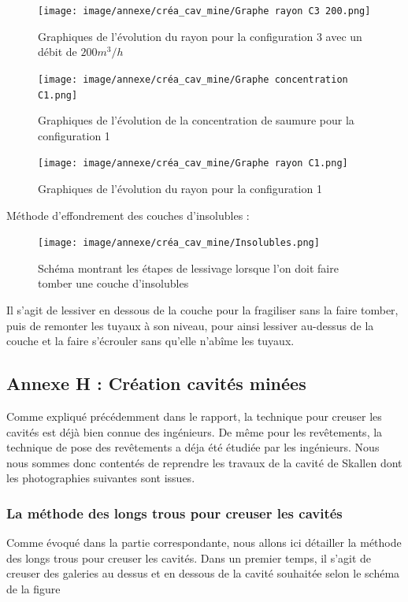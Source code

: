 \documentclass[11pt,french,a4paper]{article}
\begin{document}
\begin{figure}[!h]
  \centering
  \texttt{[image: image/annexe/créa\_cav\_mine/Graphe rayon C3 200.png]}
  \caption{Graphiques de l'évolution du rayon pour la configuration 3 avec un débit de $200m^3/h$}
  \end{figure}

\begin{figure}[!h]
  \centering
  \texttt{[image: image/annexe/créa\_cav\_mine/Graphe concentration C1.png]}
  \caption{Graphiques de l'évolution de la concentration de saumure pour la configuration 1}
  \end{figure}

\begin{figure}[!h]
  \centering
  \texttt{[image: image/annexe/créa\_cav\_mine/Graphe rayon C1.png]}
  \caption{Graphiques de l'évolution du rayon pour la configuration 1}
  \end{figure}

Méthode d’effondrement des couches d’insolubles :

\begin{figure}[!h]
  \centering
  \texttt{[image: image/annexe/créa\_cav\_mine/Insolubles.png]}
  \caption{Schéma montrant les étapes de lessivage lorsque l’on doit faire tomber une couche d’insolubles }
  \end{figure}

Il s’agit de lessiver en dessous de la couche pour la fragiliser sans la faire tomber, puis de remonter les tuyaux à son niveau, pour ainsi lessiver au-dessus de la couche et la faire s’écrouler sans qu’elle n’abîme les tuyaux. 

\FloatBarrier
\subsection*{Annexe H : Création cavités minées}
Comme expliqué précédemment dans le rapport, la technique pour creuser les cavités est déjà bien connue des ingénieurs. De même pour les revêtements, la technique de pose des revêtements a déja été étudiée par les ingénieurs. Nous nous sommes donc contentés de reprendre les travaux de la cavité de Skallen dont les photographies suivantes sont issues.

\FloatBarrier
\subsubsection*{La méthode des longs trous pour creuser les cavités}
Comme évoqué dans la partie correspondante, nous allons ici détailler la méthode des longs trous pour creuser les cavités.
Dans un premier temps, il s’agit de creuser des galeries au dessus et en dessous de la cavité souhaitée selon le schéma de la figure
\end{document}

